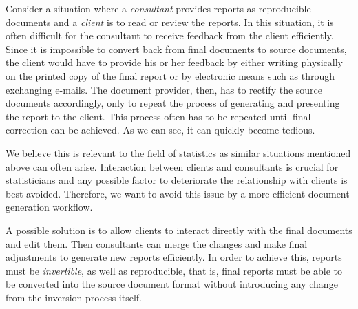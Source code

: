 \documentclass[a4paper, 12pt]{report}
\begin{document}
Consider a situation where a \emph{consultant} provides reports as reproducible documents and a \emph{client} is to read or review the reports. In this situation, it is often difficult for the consultant to receive feedback from the client efficiently. Since it is impossible to convert back from final documents to source documents, the client would have to provide his or her feedback by either writing physically on the printed copy of the final report or by electronic means such as through exchanging e-mails. The document provider, then, has to rectify the source documents accordingly, only to repeat the process of generating and presenting the report to the client. This process often has to be repeated until final correction can be achieved. As we can see, it can quickly become tedious.

We believe this is relevant to the field of statistics as similar situations mentioned above can often arise. Interaction between clients and consultants is crucial for statisticians and any possible factor to deteriorate the relationship with clients is best avoided. Therefore, we want to avoid this issue by a more efficient document generation workflow.

A possible solution is to allow clients to interact directly with the final documents and edit them. Then consultants can merge the changes and make final adjustments to generate new reports efficiently. In order to achieve this, reports must be \emph{invertible}, as well as reproducible, that is, final reports must be able to be converted into the source document format without introducing any change from the inversion process itself.
\end{document}
